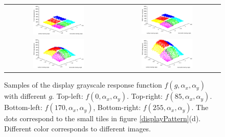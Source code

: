 \documentclass{report}
\begin{document}
\begin{figure}
\centering
\begin{tabular}{cc}
\includegraphics[width=0.5\textwidth]{images/response-gs0}&
\includegraphics[width=0.5\textwidth]{images/response-gs85} \\
\includegraphics[width=0.5\textwidth]{images/response-gs170}&
\includegraphics[width=0.5\textwidth]{images/response-gs255}

\end{tabular}
\caption{Samples of the display grayscale response function $f(g, \alpha_x, \alpha_y)$ with different $g$. Top-left: $f(0, \alpha_x, \alpha_y)$. Top-right: $f(85, \alpha_x, \alpha_y)$. Bottom-left: $f(170, \alpha_x, \alpha_y)$, Bottom-right: $f(255, \alpha_x, \alpha_y)$. The dots correspond to the small tiles in figure \ref{displayPattern}(d). Different color corresponds to different images. }
\label{displayResponse}
\end{figure}
\end{document}
